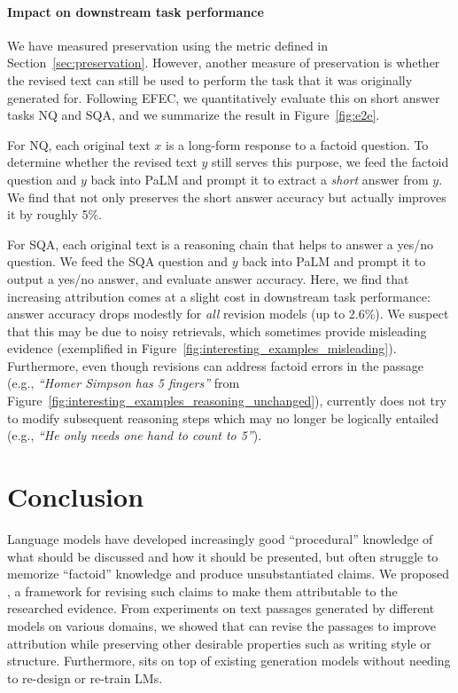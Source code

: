 \documentclass[11pt]{article}
\begin{document}


\paragraph{Impact on downstream task performance}\label{sec:e2e_eval}
We have measured preservation using the metric defined in Section~\ref{sec:preservation}. However, another measure of preservation is whether the revised text can still be used to perform the task that it was originally generated for. 
Following EFEC,
we quantitatively evaluate this on short answer tasks NQ and SQA, and we summarize the result in Figure~\ref{fig:e2e}.

For NQ, each original text $x$ is a long-form response to a factoid question. To determine whether the revised text $y$ still serves this purpose, we feed the factoid question and $y$ back into PaLM and prompt it to extract a \emph{short} answer from $y$.
We find that \approach{} not only preserves the short answer accuracy but actually improves it by roughly 5\%.

For SQA, each original text is a reasoning chain that helps to answer a yes/no question. 
We feed the SQA question and $y$ back into PaLM and prompt it to output a yes/no answer, and evaluate answer accuracy. Here, we find that increasing attribution comes at a slight cost in downstream task performance: answer accuracy drops modestly for \emph{all} revision models (up to 2.6\%). 
We suspect that this may be due to noisy retrievals, which sometimes provide misleading evidence (exemplified in Figure~\ref{fig:interesting_examples_misleading}).
Furthermore, even though revisions can address factoid errors in the passage (e.g., \emph{``Homer Simpson has 5 fingers''} from Figure~\ref{fig:interesting_examples_reasoning_unchanged}), \approach{} currently does not try to modify subsequent reasoning steps which may no longer be logically entailed (e.g., \emph{``He only needs one hand to count to 5''}).














\section{Conclusion}
Language models have developed increasingly good ``procedural'' knowledge of what should be discussed and how it should be presented, but often struggle to memorize ``factoid'' knowledge and produce unsubstantiated claims.
We proposed \approach{}, a framework for revising such claims to make them attributable to the researched evidence.
From experiments on text passages generated by different models on various domains, we showed that \approach{} can revise the passages to improve attribution while preserving other desirable properties such as writing style or structure.
Furthermore, \approach{} sits on top of existing generation models without needing to re-design or re-train LMs.
\end{document}
